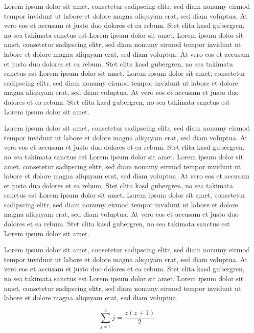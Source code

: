 \documentclass{vgtc}                          %
\begin{document}
Lorem ipsum dolor sit amet, consetetur sadipscing elitr, sed diam
nonumy eirmod tempor invidunt ut labore et dolore magna aliquyam erat,
sed diam voluptua. At vero eos et accusam et justo duo dolores et ea
rebum. Stet clita kasd gubergren, no sea takimata sanctus est Lorem
ipsum dolor sit amet. Lorem ipsum dolor sit amet, consetetur
sadipscing elitr, sed diam nonumy eirmod tempor invidunt ut labore et
dolore magna aliquyam erat, sed diam voluptua. At vero eos et accusam
et justo duo dolores et ea rebum. Stet clita kasd gubergren, no sea
takimata sanctus est Lorem ipsum dolor sit amet. Lorem ipsum dolor sit
amet, consetetur sadipscing elitr, sed diam nonumy eirmod tempor
invidunt ut labore et dolore magna aliquyam erat, sed diam
voluptua. At vero eos et accusam et justo duo dolores et ea
rebum. Stet clita kasd gubergren, no sea takimata sanctus est Lorem
ipsum dolor sit amet.

Lorem ipsum dolor sit amet, consetetur sadipscing elitr, sed diam
nonumy eirmod tempor invidunt ut labore et dolore magna aliquyam erat,
sed diam voluptua. At vero eos et accusam et justo duo dolores et ea
rebum. Stet clita kasd gubergren, no sea takimata sanctus est Lorem
ipsum dolor sit amet. Lorem ipsum dolor sit amet, consetetur
sadipscing elitr, sed diam nonumy eirmod tempor invidunt ut labore et
dolore magna aliquyam erat, sed diam voluptua. At vero eos et accusam
et justo duo dolores et ea rebum. Stet clita kasd gubergren, no sea
takimata sanctus est Lorem ipsum dolor sit amet. Lorem ipsum dolor sit
amet, consetetur sadipscing elitr, sed diam nonumy eirmod tempor
invidunt ut labore et dolore magna aliquyam erat, sed diam
voluptua. At vero eos et accusam et justo duo dolores et ea
rebum. Stet clita kasd gubergren, no sea takimata sanctus est Lorem
ipsum dolor sit amet.

Lorem ipsum dolor sit amet, consetetur sadipscing elitr, sed diam
nonumy eirmod tempor invidunt ut labore et dolore magna aliquyam erat,
sed diam voluptua. At vero eos et accusam et justo duo dolores et ea
rebum. Stet clita kasd gubergren, no sea takimata sanctus est Lorem
ipsum dolor sit amet. Lorem ipsum dolor sit amet, consetetur
sadipscing elitr, sed diam nonumy eirmod tempor invidunt ut labore et
dolore magna aliquyam erat, sed diam voluptua.

\begin{equation}
 \sum_{j=1}^{z} j = \frac{z(z+1)}{2}
\end{equation}
\end{document}
